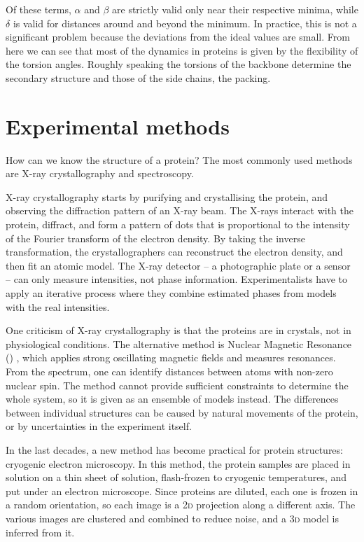 Of these terms, $\alpha$ and $\beta$ are strictly valid only near their respective minima, while $\delta$ is valid for distances around and beyond the minimum.
In practice, this is not a significant problem because the deviations from the ideal values are small. 
From here we can see that most of the dynamics in proteins is given by the flexibility of the torsion angles.
Roughly speaking the torsions of the backbone determine the secondary structure and those of the side chains, the packing.


\section{Experimental methods}
How can we know the structure of a protein?
The most commonly used methods are X-ray crystallography and \NMR{} spectroscopy.


X-ray crystallography starts by
purifying and crystallising the protein, and observing the diffraction pattern of an X-ray beam.
The X-rays interact with the protein, diffract, and form a pattern of dots that is proportional to the intensity of the Fourier transform of the electron density.
By taking the inverse transformation, the crystallographers can reconstruct the electron density, and then fit an atomic model.
The X-ray detector -- a photographic plate or a \CCD{} sensor -- can only measure intensities, not phase information.
Experimentalists have to apply an iterative process where they combine estimated phases from models with the real intensities.

One criticism of X-ray crystallography is that the proteins are in crystals, not in physiological conditions.
The alternative method is Nuclear Magnetic Resonance (\NMR) \citep{nmr}, \marginpar{\NMR} which applies strong oscillating magnetic fields and measures resonances.
From the spectrum, one can identify distances between atoms with non-zero nuclear spin.
The method cannot provide sufficient constraints to determine the whole system, so it is given as an ensemble of models instead.
The differences between individual structures can be caused by natural movements of the protein, or by uncertainties in the experiment itself.

In the last decades, 
a new method has become practical for protein structures: cryogenic electron microscopy.
In this method, the protein samples are placed in solution on a thin sheet of solution, flash-frozen to cryogenic temperatures, and put under an electron microscope.
Since proteins are diluted, each one is frozen in a random orientation, so each image is a \textsc{2d} projection along a different axis.
The various images are clustered and combined to reduce noise, and a \textsc{3d} model is inferred from it.

